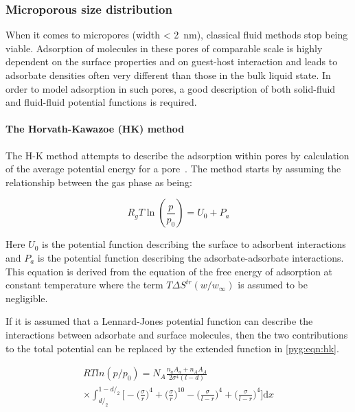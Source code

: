 \subsubsection{Microporous size distribution}

When it comes to micropores (width \SI{< 2}{\nano\metre}), classical
fluid methods stop being viable. Adsorption of molecules in these pores
of comparable scale is highly dependent on the surface properties and
on guest-host interaction and leads to adsorbate densities often
very different than those in the bulk liquid state.
In order to model adsorption in such pores, a good description of
both solid-fluid and fluid-fluid potential functions is required.

\paragraph{The Horvath-Kawazoe (HK) method}

The H-K method attempts to describe the adsorption within pores
by calculation of the average potential energy for a
pore~\cite{horvathMethodCalculationEffective1983}.
The method starts by assuming the
relationship between the gas phase as being:

\begin{equation}
	R_g T \ln(\frac{p}{p_0}) = U_0 + P_a
\end{equation}

Here \(U_0\) is the potential function describing the surface to adsorbent
interactions and \(P_a\) is the potential function describing the
adsorbate-adsorbate interactions. This equation is derived from the
equation of the free energy of adsorption at constant temperature where
the term \(T \Delta S^{tr}(w/w_{\infty})\) is assumed to be negligible.

If it is assumed that a Lennard-Jones potential function can describe
the interactions between adsorbate and surface molecules, then
the two contributions to the total potential can be replaced by the
extended function in \autoref{pyg:eqn:hk}.

\begin{multline}\label{pyg:eqn:hk}
	RTln(p/p_0) =   N_A\frac{n_a A_a + n_A A_A}{2 \sigma^{4}(l-d)} \\
	\times \int_{d/_2}^{1-d/_2}
	\Big[
		- \Big(\frac{\sigma}{r}\Big)^{4}
		+ \Big(\frac{\sigma}{r}\Big)^{10}
		- \Big(\frac{\sigma}{l-r}\Big)^{4}
		+ \Big(\frac{\sigma}{l-r}\Big)^{4}
		\Big] \mathrm{d}x
\end{multline}

